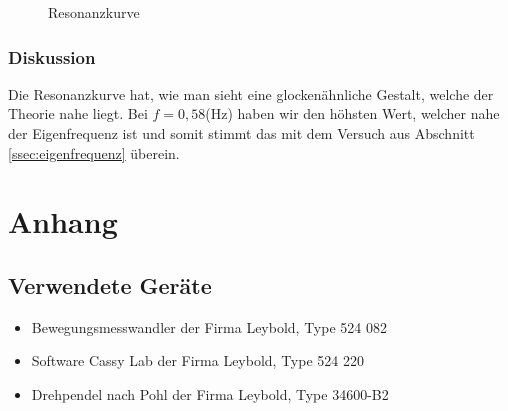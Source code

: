 \documentclass{article}
\renewcommand{\listoffigures}{%
    \begingroup
    \let\section\subsection %
    \tocsection
    \tocfile{\listfigurename}{lof}
    \endgroup
}
\renewcommand{\listoftables}{%
    \begingroup
    \let\section\subsection %
    \tocsection
    \tocfile{\listtablename}{lot}
    \endgroup
}
\begin{document}
\begin{figure}[H]
    \centering
    
    \caption{Resonanzkurve}
\end{figure}

\subsubsection{Diskussion}
Die Resonanzkurve hat, wie man sieht eine glockenähnliche Gestalt, welche der Theorie nahe liegt. Bei $f=0,58$(Hz) haben wir den höhsten Wert,
welcher nahe der Eigenfrequenz ist und somit stimmt das mit dem Versuch aus Abschnitt \ref{ssec:eigenfrequenz} überein.

\section{Anhang}
\subsection{Verwendete Geräte}
\begin{itemize}
    \itemsep0em
    \item \quad Bewegungsmesswandler der Firma Leybold, Type 524 082
    \item \quad Software Cassy Lab der Firma Leybold, Type 524 220
    \item \quad Drehpendel nach Pohl der Firma Leybold, Type 34600-B2
\end{itemize}
\listoffigures
\listoftables
\printbibheading[title={Literaturverzeichnis},heading=subbibnumbered]
\printbibliography[type=online,heading=subbibliography,title={\indent \textit{Webseiten}}]
\end{document}

